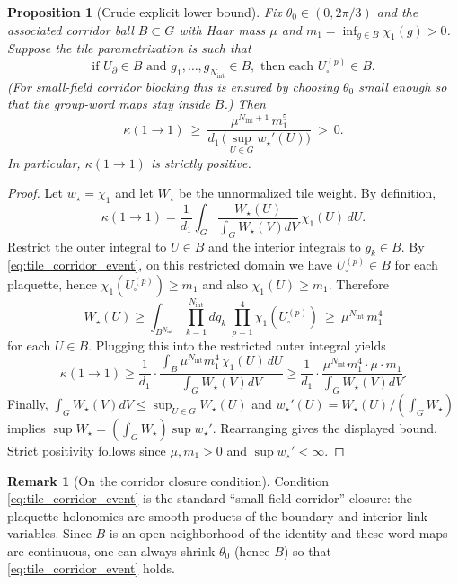 \documentclass[11pt]{article}
\newtheorem{proposition}[theorem]{Proposition}
\theoremstyle{definition}
\newtheorem{remark}[theorem]{Remark}
\newcommand{\1}{\mathbf{1}}
\begin{document}
\begin{proposition}[Crude explicit lower bound]
Fix $\theta_0\in(0,2\pi/3)$ and the associated corridor ball $B\subset G$ with Haar mass $\mu$ and $m_1=\inf_{g\in B}\chi_1(g)>0$. Suppose the tile parametrization is such that
\begin{equation}\label{eq:tile_corridor_event}
\text{if } U_{\partial}\in B \text{ and } g_1,\dots,g_{N_{\mathrm{int}}}\in B,\text{ then each } U_{\square}^{(p)}\in B.
\end{equation}
(For small-field corridor blocking this is ensured by choosing $\theta_0$ small enough so that the group-word maps stay inside $B$.)
Then
\[
\kappa(1\to1)\ \ge\ \frac{\mu^{N_{\mathrm{int}}+1}\,m_1^{5}}{d_1\,\big(\sup_{U\in G} w_\star'(U)\big)}\ >\ 0.
\]
In particular, $\kappa(1\to1)$ is strictly positive.
\end{proposition}

\begin{proof}
Let $w_\star=\chi_1$ and let $W_\star$ be the unnormalized tile weight.
By definition,
\[
\kappa(1\to1)=\frac{1}{d_1}\int_G \frac{W_\star(U)}{\int_G W_\star(V)dV}\,\chi_1(U)\,dU.
\]
Restrict the outer integral to $U\in B$ and the interior integrals to $g_k\in B$. By \eqref{eq:tile_corridor_event}, on this restricted domain we have $U_{\square}^{(p)}\in B$ for each plaquette, hence $\chi_1(U_{\square}^{(p)})\ge m_1$ and also $\chi_1(U)\ge m_1$. Therefore
\[
W_\star(U)\ge \int_{B^{N_{\mathrm{int}}}} \prod_{k=1}^{N_{\mathrm{int}}} dg_k\; \prod_{p=1}^4 \chi_1(U_{\square}^{(p)})\ \ge\ \mu^{N_{\mathrm{int}}}\,m_1^4
\]
for each $U\in B$. Plugging this into the restricted outer integral yields
\[
\kappa(1\to1)\ge \frac{1}{d_1}\cdot \frac{\int_B \mu^{N_{\mathrm{int}}}m_1^4\,\chi_1(U)\,dU}{\int_G W_\star(V)dV}
\ge \frac{1}{d_1}\cdot \frac{\mu^{N_{\mathrm{int}}}m_1^4\cdot \mu\cdot m_1}{\int_G W_\star(V)dV}.
\]
Finally, $\int_G W_\star(V)dV\le \sup_{U\in G}W_\star(U)$ and $w_\star'(U)=W_\star(U)/(\int_G W_\star)$ implies $\sup W_\star = (\int_G W_\star)\sup w_\star'$. Rearranging gives the displayed bound. Strict positivity follows since $\mu,m_1>0$ and $\sup w_\star'<\infty$.
\end{proof}

\begin{remark}[On the corridor closure condition]
Condition \eqref{eq:tile_corridor_event} is the standard ``small-field corridor'' closure: the plaquette holonomies are smooth products of the boundary and interior link variables. Since $B$ is an open neighborhood of the identity and these word maps are continuous, one can always shrink $\theta_0$ (hence $B$) so that \eqref{eq:tile_corridor_event} holds.
\end{remark}
\end{document}
